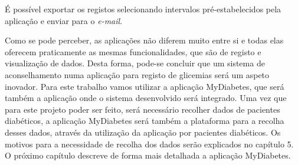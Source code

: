 É possível exportar os registos selecionando intervalos pré-estabelecidos pela aplicação e enviar para o \textit{e-mail}.\newline


Como se pode perceber, as aplicações não diferem muito entre si e todas elas oferecem praticamente as mesmas funcionalidades, que são de registo e visualização de dados. Desta forma, pode-se concluir que um sistema de aconselhamento numa aplicação para registo de glicemias será um aspeto inovador. 
Para este trabalho vamos utilizar a aplicação MyDiabetes, que será também a aplicação onde o sistema desenvolvido será integrado. Uma vez que para este projeto poder ser feito, será necessário recolher dados de pacientes diabéticos, a aplicação MyDiabetes será também a plataforma para a recolha desses dados, através da utilização da aplicação por pacientes diabéticos. Os motivos para a necessidade de recolha dos dados serão explicados no capítulo 5. O próximo capítulo descreve de forma mais detalhada a aplicação MyDiabetes.









